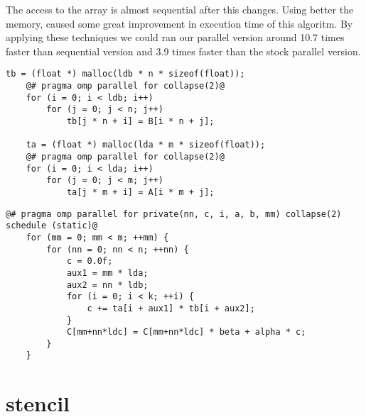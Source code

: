 \documentclass[10pt,a4paper]{report}
\begin{document}
The access to the array is almost sequential after this changes. Using better the memory, caused some great improvement in execution time of this algoritm. By applying these techniques we could ran our parallel version around 10.7 times faster than sequential version and 3.9 times faster than the stock parallel version.\\

\begin{lstlisting}[caption=Array-represented matrices transposition,style=base]
	tb = (float *) malloc(ldb * n * sizeof(float));
	@# pragma omp parallel for collapse(2)@
	for (i = 0; i < ldb; i++)
		for (j = 0; j < n; j++)
			tb[j * n + i] = B[i * n + j];

	ta = (float *) malloc(lda * m * sizeof(float));
	@# pragma omp parallel for collapse(2)@
	for (i = 0; i < lda; i++)
		for (j = 0; j < m; j++)
			ta[j * m + i] = A[i * m + j];
\end{lstlisting}

\begin{lstlisting}[caption=Our parallel source code for sgemm,style=base]
	@# pragma omp parallel for private(nn, c, i, a, b, mm) collapse(2) schedule (static)@
	for (mm = 0; mm < m; ++mm) {
		for (nn = 0; nn < n; ++nn) {
			c = 0.0f;
			aux1 = mm * lda;
			aux2 = nn * ldb;
			for (i = 0; i < k; ++i) {
				c += ta[i + aux1] * tb[i + aux2];
			}
			C[mm+nn*ldc] = C[mm+nn*ldc] * beta + alpha * c;
		}
	}
\end{lstlisting}

\newpage
\section{stencil}
\end{document}
